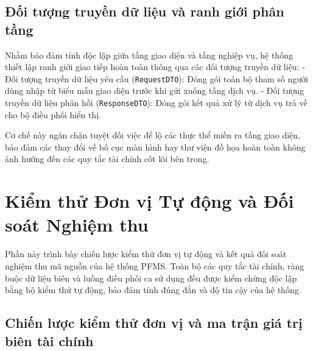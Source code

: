 \documentclass[a4paper,12pt]{report}
\newcommand{\passthrough}[1]{#1}
\begin{document}
\section{Đối tượng truyền dữ liệu và ranh giới phân
tầng}\label{ux111ux1ed1i-tux1b0ux1ee3ng-truyux1ec1n-dux1eef-liux1ec7u-vuxe0-ranh-giux1edbi-phuxe2n-tux1ea7ng}

Nhằm bảo đảm tính độc lập giữa tầng giao diện và tầng nghiệp vụ, hệ
thống thiết lập ranh giới giao tiếp hoàn toàn thông qua các đối tượng
truyền dữ liệu: - Đối tượng truyền dữ liệu yêu cầu
(\passthrough{\lstinline!RequestDTO!}): Đóng gói toàn bộ tham số người
dùng nhập từ biểu mẫu giao diện trước khi gửi xuống tầng dịch vụ. - Đối
tượng truyền dữ liệu phản hồi (\passthrough{\lstinline!ResponseDTO!}):
Đóng gói kết quả xử lý từ dịch vụ trả về cho bộ điều phối hiển thị.

Cơ chế này ngăn chặn tuyệt đối việc để lộ các thực thể miền ra tầng giao
diện, bảo đảm các thay đổi về bố cục màn hình hay thư viện đồ họa hoàn
toàn không ảnh hưởng đến các quy tắc tài chính cốt lõi bên trong.

\chapter{Kiểm thử Đơn vị Tự động và Đối soát Nghiệm
thu}\label{kiux1ec3m-thux1eed-ux111ux1a1n-vux1ecb-tux1ef1-ux111ux1ed9ng-vuxe0-ux111ux1ed1i-souxe1t-nghiux1ec7m-thu}

Phần này trình bày chiến lược kiểm thử đơn vị tự động và kết quả đối
soát nghiệm thu mã nguồn của hệ thống PFMS. Toàn bộ các quy tắc tài
chính, ràng buộc dữ liệu biên và luồng điều phối ca sử dụng đều được
kiểm chứng độc lập bằng bộ kiểm thử tự động, bảo đảm tính đúng đắn và độ
tin cậy của hệ thống.

\section{Chiến lược kiểm thử đơn vị và ma trận giá trị biên tài
chính}\label{chiux1ebfn-lux1b0ux1ee3c-kiux1ec3m-thux1eed-ux111ux1a1n-vux1ecb-vuxe0-ma-trux1eadn-giuxe1-trux1ecb-biuxean-tuxe0i-chuxednh}
\end{document}
